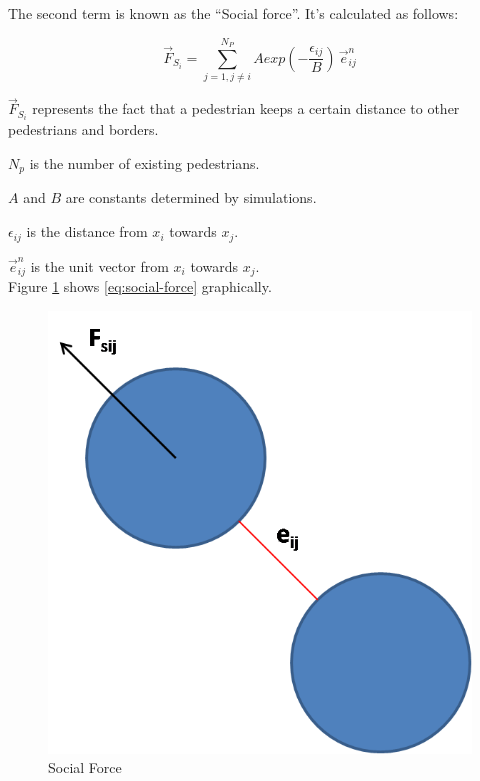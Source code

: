 \documentclass[english]{article}
\begin{document}
The second term is known as the ``Social force''. It's calculated
as follows:

\begin{equation}
\vec{F}_{S_{i}}=\sum_{j=1,j\ne i}^{N_{P}}Aexp(-\frac{\epsilon_{ij}}{B})\,\vec{e}_{ij}^{n}\label{eq:social-force}
\end{equation}


$\vec{F}_{S_{i}}$ represents the fact that a pedestrian keeps a certain
distance to other pedestrians and borders.

$N_{p}$ is the number of existing pedestrians.

$A$ and $B$ are constants determined by simulations.

$\epsilon_{ij}$ is the distance from $x_{i}$ towards $x_{j}$.

$\vec{e}_{ij}^{n}$ is the unit vector from $x_{i}$ towards $x_{j}$.\\


Figure \ref{fig:Social-Force} shows \ref{eq:social-force} graphically.

\begin{figure}[h]
\begin{centering}
\includegraphics[scale=0.4]{pics/sfm/sf} 
\par\end{centering}

\caption{Social Force\label{fig:Social-Force}}
\end{figure}
\end{document}
